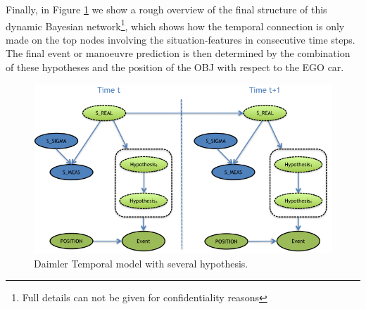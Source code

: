 Finally, in Figure \ref{Figure:daimlerLEdynGeneric} we show a rough overview of the final structure of this dynamic Bayesian network\footnote{Full details can not be given for confidentiality reasons}, which shows how the temporal connection is only made on the top nodes involving the situation-features in consecutive time steps.  The final event or manoeuvre prediction is then determined by the combination of these hypotheses and the position of the OBJ with respect to the EGO car.

\begin{figure}
\begin{center}
\includegraphics[scale=0.58]{./figures/DaimlerLEdynGeneric}
\end{center}
\caption{\label{Figure:daimlerLEdynGeneric}Daimler Temporal model with several hypothesis.}
\end{figure}





